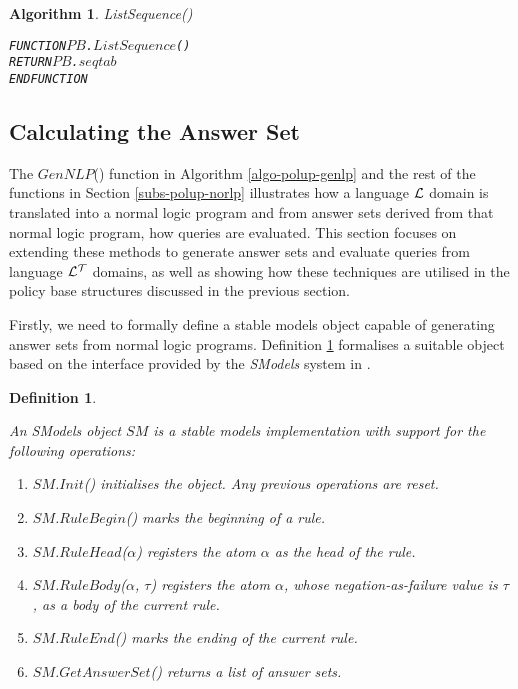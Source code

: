 \documentclass[11pt]{report}
\newtheorem{vdefinition}{Definition}[chapter]
\newenvironment{vverbatim}
{
  \begin{alltt}
}
{
    \vspace{-\baselineskip}
  \end{alltt}
}
\newtheorem{vvalgorithm}{Algorithm}[chapter]
\newenvironment{valgorithm}[2]
{
  \begin{vvalgorithm}{#1}
    \label{#2}
    \small
    \begin{vverbatim}
}
{
    \end{vverbatim}
  \end{vvalgorithm}
}
\begin{document}
          \begin{valgorithm}{ListSequence()}{algo-impln-lsseq}
FUNCTION \(PB\).\(ListSequence\)(\(\))
  RETURN \(PB\).\(seqtab\)
ENDFUNCTION
          \end{valgorithm}

      \subsection{Calculating the Answer Set}

        The $GenNLP$() function in Algorithm \ref{algo-polup-genlp} and the
        rest of the functions in Section \ref{subs-polup-norlp} illustrates
        how a language ${\cal L}$ domain is translated into a normal logic
        program and from answer sets derived from that normal logic program,
        how queries are evaluated. This section focuses on extending these
        methods to generate answer sets and evaluate queries from language
        ${\cal L^T}$ domains, as well as showing how these techniques are
        utilised in the policy base structures discussed in the previous
        section.

        Firstly, we need to formally define a stable models object capable
        of generating answer sets from normal logic programs. Definition
        \ref{defn-impln-smobj} formalises a suitable object based on the
        interface provided by the {\em SModels} system in \cite{NIE,SIM2}.

        \begin{vdefinition}
          \label{defn-impln-smobj}

          An SModels object $SM$ is a stable models implementation with
          support for the following operations:

          \begin{enumerate}
            \item
              $SM$.$Init$() initialises the object. Any previous operations are
              reset.
 
            \item
              $SM$.$RuleBegin$() marks the beginning of a rule.
 
            \item
              $SM$.$RuleHead$($\alpha$) registers the atom $\alpha$ as the
              head of the rule.
 
            \item
              $SM$.$RuleBody$($\alpha$, $\tau$) registers the atom $\alpha$,
              whose negation-as-failure value is $\tau$, as a body of the
              current rule.
 
            \item
              $SM$.$RuleEnd$() marks the ending of the current rule.
 
            \item
              $SM$.$GetAnswerSet$() returns a list of answer sets.
          \end{enumerate}
        \end{vdefinition}
\end{document}
